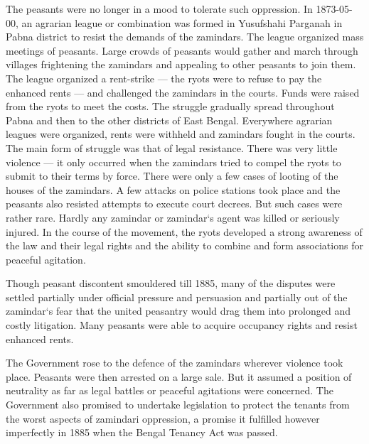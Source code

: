 The peasants were no longer in a mood to tolerate such oppression. In 1873-05-00, an agrarian league or combination was formed in Yusufshahi Parganah in Pabna district to resist the demands of the zamindars. The league organized mass meetings of peasants. Large crowds of peasants would gather and march through villages frightening the zamindars and appealing to other peasants to join them. The league organized a rent-strike — the ryots were to refuse to pay the enhanced rents — and challenged the zamindars in the courts. Funds were raised from the ryots to meet the costs. The struggle gradually spread throughout Pabna and then to the other districts of East Bengal. Everywhere agrarian leagues were organized, rents were withheld and zamindars fought in the courts. The main form of struggle was that of legal resistance. There was very little violence — it only occurred when the zamindars tried to compel the ryots to submit to their terms by force. There were only a few cases of looting of the houses of the zamindars. A few attacks on police stations took place and the peasants also resisted attempts to execute court decrees. But such cases were rather rare. Hardly any zamindar or zamindar‘s agent was killed or seriously injured. In the course of the movement, the ryots developed a strong awareness of the law and their legal rights and the ability to combine and form associations for peaceful agitation.

Though peasant discontent smouldered till 1885, many of the disputes were settled partially under official pressure and persuasion and partially out of the zamindar‘s fear that the united peasantry would drag them into prolonged and costly litigation. Many peasants were able to acquire occupancy rights and resist enhanced rents.

The Government rose to the defence of the zamindars wherever violence took place. Peasants were then arrested on a large sale. But it assumed a position of neutrality as far as legal battles or peaceful agitations were concerned. The Government also promised to undertake legislation to protect the tenants from the worst aspects of zamindari oppression, a promise it fulfilled however imperfectly in 1885 when the Bengal Tenancy Act was passed.

